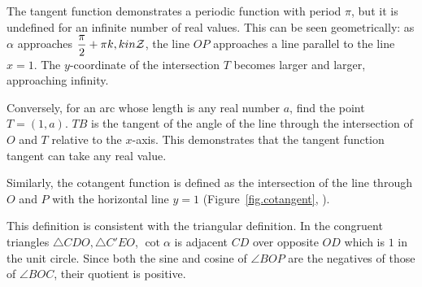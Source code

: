 The tangent function demonstrates a periodic function with period $\pi$, but it is undefined for an infinite number of real values. This can be seen geometrically: as $\alpha$ approaches $\displaystyle\frac{\pi}{2}+\pi k, k in \mathcal{Z}$, the line $OP$ approaches a line parallel to the line $x=1$. The $y$-coordinate of the intersection $T$ becomes larger and larger, approaching infinity.

Conversely, for an arc whose length is any real number $a$, find the point $T=(1,a)$. $TB$ is the tangent of the angle of the line through the intersection of $O$ and $T$ relative to the $x$-axis.
This demonstrates that the tangent function tangent can take any real value.

Similarly, the cotangent function is defined as the intersection of the line through $O$ and $P$ with the horizontal line $y = 1$ (Figure~\ref{fig.cotangent}, ).

This definition is consistent with the triangular definition. In the congruent triangles $\triangle CDO,\triangle C'EO$, $\cot \alpha$ is adjacent $CD$ over opposite $OD$ which is $1$ in the unit circle. Since both the sine and cosine of $\angle BOP$ are the negatives of those of $\angle BOC$, their quotient is positive.


